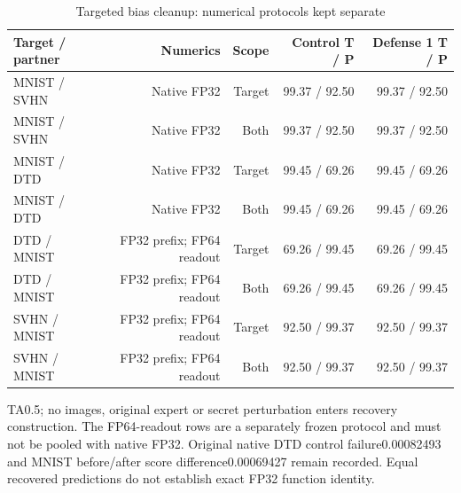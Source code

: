 \begin{table}[!htbp]
\centering
\small
\caption{Targeted bias cleanup: numerical protocols kept separate}
\label{tab:cleanup}
\begin{tabular}{lrrrr}
\toprule
Target / partner & Numerics & Scope & Control T / P & Defense 1 T / P \\
\midrule
MNIST / SVHN & Native FP32 & Target & 99.37 / 92.50 & 99.37 / 92.50 \\
MNIST / SVHN & Native FP32 & Both & 99.37 / 92.50 & 99.37 / 92.50 \\
MNIST / DTD & Native FP32 & Target & 99.45 / 69.26 & 99.45 / 69.26 \\
MNIST / DTD & Native FP32 & Both & 99.45 / 69.26 & 99.45 / 69.26 \\
DTD / MNIST & FP32 prefix; FP64 readout & Target & 69.26 / 99.45 & 69.26 / 99.45 \\
DTD / MNIST & FP32 prefix; FP64 readout & Both & 69.26 / 99.45 & 69.26 / 99.45 \\
SVHN / MNIST & FP32 prefix; FP64 readout & Target & 92.50 / 99.37 & 92.50 / 99.37 \\
SVHN / MNIST & FP32 prefix; FP64 readout & Both & 92.50 / 99.37 & 92.50 / 99.37 \\
\bottomrule
\end{tabular}
\par\vspace{3pt}\begin{minipage}{0.98\linewidth}\footnotesize TA0.5; no images, original expert or secret perturbation enters recovery construction. The FP64-readout rows are a separately frozen protocol and must not be pooled with native FP32. Original native DTD control failure0.00082493 and MNIST before/after score difference0.00069427 remain recorded. Equal recovered predictions do not establish exact FP32 function identity.\end{minipage}
\end{table}

